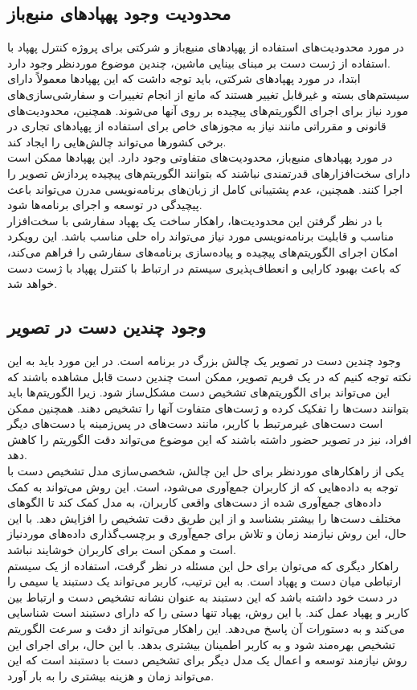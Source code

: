\subsection{محدودیت وجود پهپاد‌های منبع‌باز}
در مورد محدودیت‌های استفاده از پهپادهای منبع‌باز و شرکتی برای پروژه کنترل پهپاد با استفاده از ژست دست بر مبنای بینایی ماشین، چندین موضوع موردنظر وجود دارد. 
\\
ابتدا، در مورد پهپادهای شرکتی، باید توجه داشت که این پهپادها معمولاً دارای سیستم‌های بسته و غیرقابل تغییر هستند که مانع از انجام تغییرات و سفارشی‌سازی‌های مورد نیاز برای اجرای الگوریتم‌های پیچیده بر روی آنها می‌شوند. همچنین، 
محدودیت‌های قانونی و مقرراتی مانند نیاز به مجوزهای خاص برای استفاده از پهپادهای تجاری در برخی کشورها می‌تواند چالش‌هایی را ایجاد کند.
\\
در مورد پهپادهای منبع‌باز، محدودیت‌های متفاوتی وجود دارد. این پهپادها ممکن است دارای سخت‌افزارهای قدرتمندی نباشند که بتوانند الگوریتم‌های پیچیده پردازش تصویر را اجرا کنند. همچنین، عدم پشتیبانی کامل از زبان‌های برنامه‌نویسی مدرن می‌تواند باعث پیچیدگی در توسعه و اجرای برنامه‌ها شود.
\\
با در نظر گرفتن این محدودیت‌ها، راهکار ساخت یک پهپاد سفارشی با سخت‌افزار مناسب و قابلیت برنامه‌نویسی مورد نیاز می‌تواند راه حلی مناسب باشد. این رویکرد امکان اجرای الگوریتم‌های پیچیده و پیاده‌سازی برنامه‌های سفارشی را فراهم می‌کند، که باعث بهبود کارایی و انعطاف‌پذیری سیستم در ارتباط با کنترل پهپاد با ژست دست خواهد شد.

\subsection{وجود چندین دست در تصویر}
وجود چندین دست در تصویر یک چالش بزرگ در برنامه است. در این مورد باید به این نکته توجه کنیم که در یک فریم تصویر، ممکن است چندین دست قابل مشاهده باشند که این می‌تواند برای الگوریتم‌های تشخیص دست مشکل‌ساز شود. زیرا 
الگوریتم‌ها باید بتوانند دست‌ها را تفکیک کرده و ژست‌های متفاوت آنها را تشخیص دهند. همچنین ممکن است دست‌های غیرمرتبط با کاربر، مانند دست‌های در پس‌زمینه یا دست‌های دیگر افراد، نیز در تصویر حضور داشته باشند که این موضوع می‌تواند دقت الگوریتم را کاهش دهد.
\\
یکی از راهکارهای موردنظر برای حل این چالش، شخصی‌سازی مدل تشخیص دست با توجه به داده‌هایی که از کاربران جمع‌آوری می‌شود، است. این روش می‌تواند به کمک داده‌های جمع‌آوری شده از دست‌های واقعی کاربران، به مدل کمک 
کند تا الگوهای مختلف دست‌ها را بیشتر بشناسد و از این طریق دقت تشخیص را افزایش دهد. با این حال، این روش نیازمند زمان و تلاش برای جمع‌آوری و برچسب‌گذاری داده‌های موردنیاز است و ممکن است برای کاربران خوشایند نباشد.
\\
راهکار دیگری که می‌توان برای حل این مسئله در نظر گرفت، استفاده از یک سیستم ارتباطی میان دست و پهپاد است. به این ترتیب، کاربر می‌تواند یک دستبند یا سیمی را در دست خود داشته باشد که این دستبند به عنوان نشانه تشخیص دست و 
ارتباط بین کاربر و پهپاد عمل کند. با این روش، پهپاد تنها دستی را که دارای دستبند است شناسایی می‌کند و به دستورات آن پاسخ می‌دهد. این راهکار می‌تواند از دقت و سرعت الگوریتم تشخیص بهره‌مند شود و به کاربر اطمینان بیشتری بدهد. با 
این حال، برای اجرای این روش نیازمند توسعه و اعمال یک مدل دیگر برای تشخیص دست با دستبند است که این می‌تواند زمان و هزینه بیشتری را به بار آورد.


